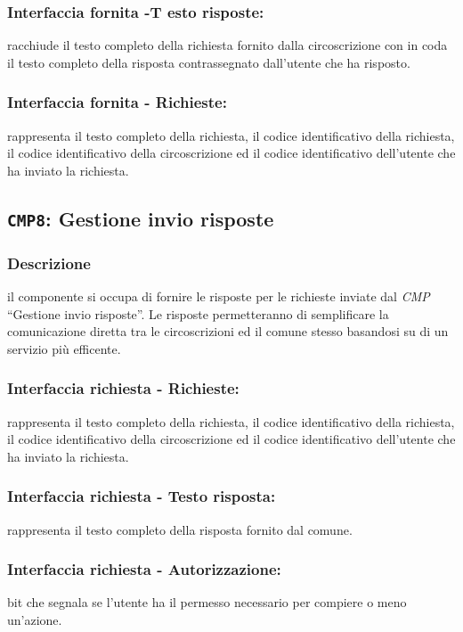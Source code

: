         \subsubsection{Interfaccia fornita -T esto risposte:}
            racchiude il testo completo della richiesta fornito dalla circoscrizione con in coda il testo completo della risposta contrassegnato dall'utente che ha risposto.
        \subsubsection{Interfaccia fornita - Richieste:}
            rappresenta il testo completo della richiesta, il codice identificativo della richiesta, il codice identificativo della circoscrizione ed il codice identificativo dell'utente che ha inviato la richiesta.

    \subsection{\texttt{CMP8}: Gestione invio risposte}
        \subsubsection{Descrizione}
            il componente si occupa di fornire le risposte per le richieste inviate dal \textit{CMP} ``Gestione invio risposte''. Le risposte permetteranno di semplificare la comunicazione diretta tra le circoscrizioni ed il comune stesso basandosi su di un servizio più efficente.
        \subsubsection{Interfaccia richiesta - Richieste:}
            rappresenta il testo completo della richiesta, il codice identificativo della richiesta, il codice identificativo della circoscrizione ed il codice identificativo dell'utente che ha inviato la richiesta.
        \subsubsection{Interfaccia richiesta - Testo risposta:}
            rappresenta il testo completo della risposta fornito dal comune.
        \subsubsection{Interfaccia richiesta - Autorizzazione:}
            bit che segnala se l'utente ha il permesso necessario per compiere o meno un'azione.
